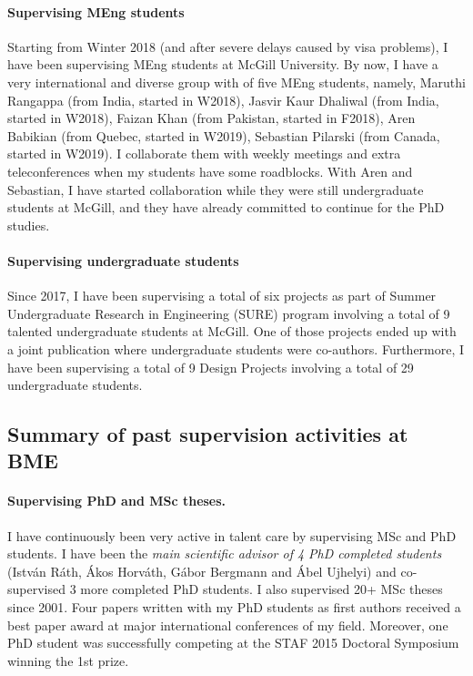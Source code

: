 \paragraph{Supervising MEng students}
Starting from Winter 2018 (and after severe delays caused by visa problems), I have been supervising MEng students at McGill University. By now, I have a very international and diverse group with of five MEng students, namely, Maruthi Rangappa (from India, started in W2018), Jasvir Kaur Dhaliwal (from India, started in W2018), Faizan Khan (from Pakistan, started in F2018), Aren Babikian (from Quebec, started in W2019), Sebastian Pilarski (from Canada, started in W2019). I collaborate them with weekly meetings and extra teleconferences when my students have some roadblocks. With Aren and Sebastian, I have started collaboration while they were still undergraduate students at McGill, and they have already committed to continue for the PhD studies.  

\paragraph{Supervising undergraduate students}
Since 2017, I have been supervising a total of six projects as part of Summer Undergraduate Research in Engineering (SURE) program involving a total of 9 talented undergraduate students at McGill. One of those projects ended up with a joint publication \cite{icse2019-tool} where undergraduate students were co-authors. Furthermore, I have been supervising a total of 9 Design Projects involving a total of 29 undergraduate students. 

\subsection{Summary of past supervision activities at BME}


\paragraph{Supervising PhD and MSc theses.}
I have continuously been very active in talent care by supervising MSc and PhD students. I have been the \emph{main scientific advisor of 4 PhD completed students} (István Ráth, Ákos Horváth, Gábor Bergmann and Ábel Ujhelyi) and co-supervised 3 more completed PhD students. I also supervised 20+ MSc theses since 2001. Four papers written with my PhD students as first authors received a best paper award at major international conferences of my field. Moreover, one PhD student was successfully competing at the STAF 2015 Doctoral Symposium winning the 1st prize. 


